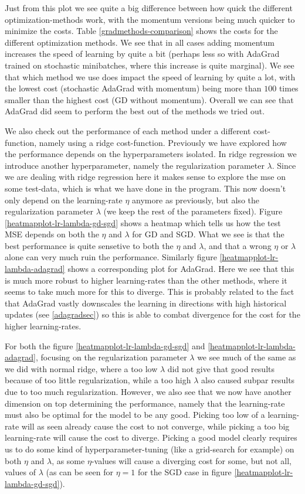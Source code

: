 \documentclass{article}
\begin{document}
Just from this plot we see quite a big difference between how quick the
different optimization-methods work, with the momentum versions being much
quicker to minimize the costs. Table \ref{gradmethods-comparison} shows the
costs for the different optimization methods. We see that
in all cases adding momentum increases the speed of learning by quite a bit
(perhaps less so with AdaGrad trained on stochastic minibatches, where this
increase is quite marginal). We see that which method we use does impact the
speed of learning by quite a lot, with the lowest cost (stochastic AdaGrad with
momentum) being more than $100$ times smaller than the highest cost (GD without
momentum). Overall we can see that AdaGrad did seem to perform the best out of
the methods we tried out.

We also check out the performance of each method under a different
cost-function, namely using a ridge cost-function. Previously we have explored
how the performance depends on the hyperparameters isolated. In ridge regression
we introduce another hyperparameter, namely the regularization parameter
$\lambda$. Since we are dealing with ridge regression here it makes sense to
explore the mse on some test-data, which is what we have done in the program.
This now doesn't only depend on the learning-rate $\eta$ anymore as previously,
but also the regularization parameter $\lambda$ (we keep the rest of the
parameters fixed).  Figure \ref{heatmapplot-lr-lambda-gd-sgd} shows a heatmap
which tells us how the test MSE depends on both the $\eta$ and $\lambda$ for GD and SGD.
What we see is that the best performance is quite sensetive to both the $\eta$
and $\lambda$, and that a wrong $\eta$ or $\lambda$ alone can very much ruin the
performance. Similarly figure \ref{heatmapplot-lr-lambda-adagrad} shows a corresponding
plot for AdaGrad. Here we see that this is much more robust to higher
learning-rates than the other methods, where it seems to take much more for this
to diverge. This is probably related to the fact that AdaGrad vastly downscales
the learning in directions with high historical updates (see \ref{adagradsec})
so this is able to combat divergence for the cost for the higher learning-rates.

For both the figure \ref{heatmapplot-lr-lambda-gd-sgd} and
\ref{heatmapplot-lr-lambda-adagrad}, focusing on the regularization parameter
$\lambda$ we see much of the same as we did with normal ridge, where a too low
$\lambda$ did not give that good results because of too little regularization,
while a too high $\lambda$ also caused subpar results due to too much
regularization. However, we also see that we now have another dimension on top
determining the performance, namely that the learning-rate must also be optimal
for the model to be any good. Picking too low of a learning-rate will as seen
already cause the cost to not converge, while picking a too big learning-rate
will cause the cost to diverge. Picking a good model clearly requires us to do some
kind of hyperparameter-tuning (like a grid-search for example) on both $\eta$
and $\lambda$, as some $\eta$-values will cause a diverging cost for some, but
not all, values of $\lambda$ (as can be seen for $\eta = 1$ for the SGD case in
figure \ref{heatmapplot-lr-lambda-gd-sgd}).
\end{document}
